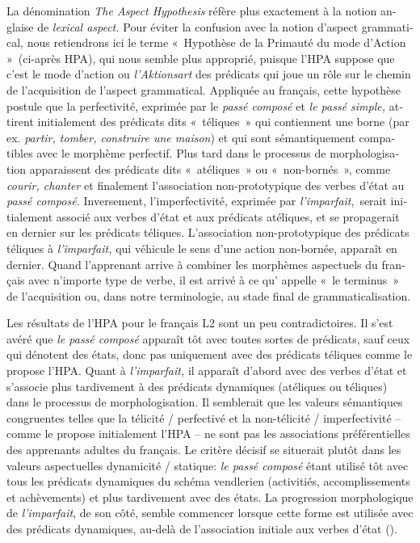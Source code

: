 \documentclass[french, output=paper]{langscibook}
\begin{document}
\begin{otherlanguage}{french}
La dénomination \textit{The Aspect Hypothesis} réfère plus exactement à la notion anglaise de \textit{lexical aspect.} Pour éviter la confusion avec la notion d’aspect grammatical, nous retiendrons ici le terme «~Hypothèse de la Primauté du mode d’Action »~(ci-après HPA), qui nous semble plus approprié, puisque l’HPA suppose que c’est le mode d’action ou \textit{l’Aktionsart} des prédicats qui joue un rôle sur le chemin de l’acquisition de l’aspect grammatical. Appliquée au français, cette hypothèse postule que la perfectivité, exprimée par le \textit{passé composé} et \textit{le passé simple,} attirent initialement des prédicats dits «~téliques~» qui contiennent une borne (par ex. \textit{partir, tomber, construire une maison}) et qui sont sémantiquement compatibles avec le morphème perfectif.  Plus tard dans le processus de morphologisation apparaissent des prédicats dits «~atéliques~» ou «~non-bornés~», comme \textit{courir, chanter} et finalement l’association non-prototypique des verbes d’état au \textit{passé composé.} Inversement, l’imperfectivité, exprimée par \textit{l’imparfait},~serait initialement associé aux verbes d’état et aux prédicats atéliques, et se propagerait en dernier sur les prédicats téliques. L’association non-prototypique des prédicats téliques à \textit{l’imparfait,} qui véhicule le sens d’une action non-bornée, apparaît en dernier. Quand l’apprenant arrive à combiner les morphèmes aspectuels du français avec n’importe type de verbe, il est arrivé à ce qu’\citet{Andersen1991} appelle «~le terminus~» de l’acquisition ou, dans notre terminologie, au stade final de grammaticalisation.



Les résultats de l’HPA pour le français L2 sont un peu contradictoires. Il s’est avéré que \textit{le passé composé} apparaît tôt avec toutes sortes de prédicats, sauf ceux qui dénotent des états, donc pas uniquement avec des prédicats téliques comme le propose l’HPA. Quant à \textit{l’imparfait,} il apparaît d’abord avec des verbes d’état et s’associe plus tardivement à des prédicats dynamiques (atéliques ou téliques) dans le processus de morphologisation. Il semblerait que les valeurs sémantiques congruentes telles que la télicité / perfectivé et la non-télicité / imperfectivité -- comme le propose initialement l’HPA -- ne sont pas les associations préférentielles des apprenants adultes du français. Le critère décisif se situerait plutôt dans les valeurs aspectuelles dynamicité / statique: \textit{le passé composé} étant utilisé tôt avec tous les prédicats dynamiques du schéma vendlerien (activitiés, accomplissements et achèvements) et plus tardivement avec des états. La progression morphologique de \textit{l’imparfait}, de son côté, semble commencer lorsque cette forme est utilisée avec des prédicats dynamiques, au-delà de l’association initiale aux verbes d’état (\citealt{Noyau1997, Kihlstedt2002, Thomas2009}).



\end{otherlanguage}
\end{document}
